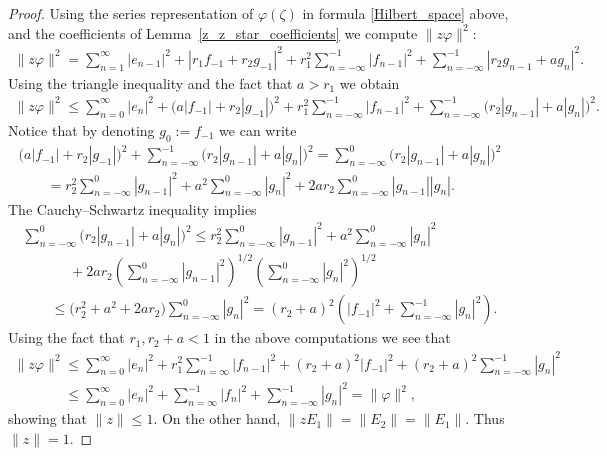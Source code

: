 \documentclass[11pt]{article}
\numberwithin{equation}{section}
\begin{document}
\begin{proof}
Using the series representation of $\varphi(\zeta)$ in formula \eqref{Hilbert_space} above, and the coef\/f\/icients of
Lemma~\ref{z_z_star_coefficients} we compute $\|z\varphi\|^2$:
\begin{gather*}
\|z\varphi\|^2=\sum\limits_{n=1}^\infty |e_{n-1}|^2+|r_1f_{-1}+r_2g_{-1}|^2+r_1^2\sum\limits_{n=-\infty}^{-1}
|f_{n-1}|^2+\sum\limits_{n=-\infty}^{-1}|r_2g_{n-1}+ag_n|^2.
\end{gather*}
Using the triangle inequality and the fact that $a> r_1$ we obtain
\begin{gather*}
\|z\varphi\|^2 \le \sum\limits_{n=0}^\infty |e_n|^2+\big(a|f_{-1}|+r_2|g_{-1}|\big)^2+r_1^2
\sum\limits_{n=-\infty}^{-1}|f_{n-1}|^2+\sum\limits_{n=-\infty}^{-1}\big(r_2|g_{n-1}|+a|g_n|\big)^2.
\end{gather*}
Notice that by denoting $g_0:= f_{-1}$ we can write
\begin{gather*}
\big(a|f_{-1}|+r_2|g_{-1}|\big)^2+\sum\limits_{n=-\infty}^{-1}\big(r_2|g_{n-1}|+a|g_n|\big)^2=
\sum\limits_{n=-\infty}^{0}\big(r_2|g_{n-1}|+a|g_n|\big)^2
\\
\qquad{}
=r_2^2 \sum\limits_{n=-\infty}^0 |g_{n-1}|^2+ a^2\sum\limits_{n=-\infty}^0 |g_n|^2+2ar_2 \sum\limits_{n=-\infty}^0
|g_{n-1}||g_n|.
\end{gather*}
The Cauchy--Schwartz inequality implies
\begin{gather*}
\sum\limits_{n=-\infty}^{0}\big(r_2|g_{n-1}|+a|g_n|\big)^2   \leq r_2^2 \sum\limits_{n=-\infty}^0 |g_{n-1}|^2+
a^2\sum\limits_{n=-\infty}^0 |g_n|^2
\\
\qquad
\phantom{\leq}  {}
+2ar_2 \left(\sum\limits_{n=-\infty}^0 |g_{n-1}|^2\right)^{1/2}\left(\sum\limits_{n=-\infty}^0 |g_n|^2\right)^{1/2}
\\
\qquad
\leq \big(r_2^2+a^2+2ar_2\big) \sum\limits_{n=-\infty}^0 |g_n|^2 =(r_2+a)^2 \left(|f_{-1}|^2+\sum\limits_{n=-\infty}^{-1} |g_n|^2\right).
\end{gather*}
Using the fact that $r_1, r_2+a <1$ in the above computations we see that
\begin{gather*}
\|z\varphi\|^2  \le \sum\limits_{n=0}^\infty |e_n|^2+r_1^2\sum\limits_{n=\infty}^{-1}|f_{n-1}|^2+(r_2+a)^2
|f_{-1}|^2+(r_2+a)^2\sum\limits_{n=-\infty}^{-1}|g_n|^2
\\
\phantom{\|z\varphi\|^2}{}
 \leq \sum\limits_{n=0}^\infty |e_n|^2+\sum\limits_{n=\infty}^{-1}|f_n|^2+\sum\limits_{n=-\infty}^{-1}|g_n|^2 =
\|\varphi\|^2,
\end{gather*}
showing that $\|z\|\le 1$.
On the other hand, $\|zE_1\| =\| E_2\|=\|E_1\|$.
Thus $\|z\|=1$.
\end{proof}
\end{document}
